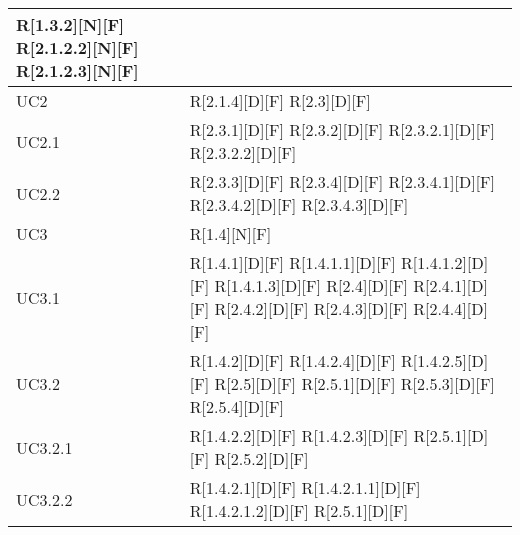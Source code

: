 \begin{longtable}{X | X}
R[1.3.2][N][F] \newline
R[2.1.2.2][N][F] \newline
R[2.1.2.3][N][F]  \\
\hline
UC2 & R[2.1.4][D][F] \newline
R[2.3][D][F]  \\
\hline
UC2.1 & R[2.3.1][D][F] \newline
R[2.3.2][D][F] \newline
R[2.3.2.1][D][F] \newline
R[2.3.2.2][D][F]  \\
\hline
UC2.2 & R[2.3.3][D][F] \newline
R[2.3.4][D][F] \newline
R[2.3.4.1][D][F] \newline
R[2.3.4.2][D][F] \newline
R[2.3.4.3][D][F]  \\
\hline
UC3 & R[1.4][N][F]  \\
\hline
UC3.1 & R[1.4.1][D][F] \newline
R[1.4.1.1][D][F] \newline
R[1.4.1.2][D][F] \newline
R[1.4.1.3][D][F] \newline
R[2.4][D][F] \newline
R[2.4.1][D][F] \newline
R[2.4.2][D][F] \newline
R[2.4.3][D][F] \newline
R[2.4.4][D][F]  \\
\hline
UC3.2 & R[1.4.2][D][F] \newline
R[1.4.2.4][D][F] \newline
R[1.4.2.5][D][F] \newline
R[2.5][D][F] \newline
R[2.5.1][D][F] \newline
R[2.5.3][D][F] \newline
R[2.5.4][D][F]  \\
\hline
UC3.2.1 & R[1.4.2.2][D][F] \newline
R[1.4.2.3][D][F] \newline
R[2.5.1][D][F] \newline
R[2.5.2][D][F]  \\
\hline
UC3.2.2 & R[1.4.2.1][D][F] \newline
R[1.4.2.1.1][D][F] \newline
R[1.4.2.1.2][D][F] \newline
R[2.5.1][D][F] \newline

\end{longtable}
